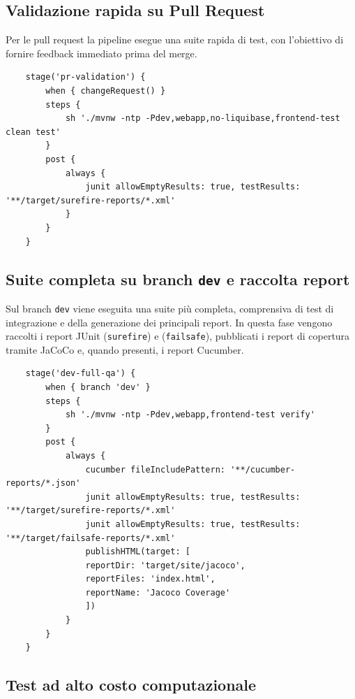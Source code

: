 \subsection{Validazione rapida su Pull Request}
Per le pull request la pipeline esegue una suite rapida di test, con l’obiettivo di fornire feedback immediato prima del merge.

\captionsetup{type=listing}
\label{lst:jenkins-pr}
\begin{verbatim}
	stage('pr-validation') {
		when { changeRequest() }
		steps {
			sh './mvnw -ntp -Pdev,webapp,no-liquibase,frontend-test clean test'
		}
		post {
			always {
				junit allowEmptyResults: true, testResults: '**/target/surefire-reports/*.xml'
			}
		}
	}
\end{verbatim}

\subsection{Suite completa su branch \texttt{dev} e raccolta report}

Sul branch \texttt{dev} viene eseguita una suite più completa, comprensiva di test di integrazione e della generazione dei principali report. In questa fase vengono raccolti i report JUnit (\texttt{surefire}) e (\texttt{failsafe}), pubblicati i report di copertura tramite JaCoCo e, quando presenti, i report Cucumber.

\captionsetup{type=listing}
\label{lst:jenkins-dev}
\begin{verbatim}
	stage('dev-full-qa') {
		when { branch 'dev' }
		steps {
			sh './mvnw -ntp -Pdev,webapp,frontend-test verify'
		}
		post {
			always {
				cucumber fileIncludePattern: '**/cucumber-reports/*.json'
				junit allowEmptyResults: true, testResults: '**/target/surefire-reports/*.xml'
				junit allowEmptyResults: true, testResults: '**/target/failsafe-reports/*.xml'
				publishHTML(target: [
				reportDir: 'target/site/jacoco',
				reportFiles: 'index.html',
				reportName: 'Jacoco Coverage'
				])
			}
		}
	}
\end{verbatim}

\subsection{Test ad alto costo computazionale}
\label{sub:heavy-tests}

